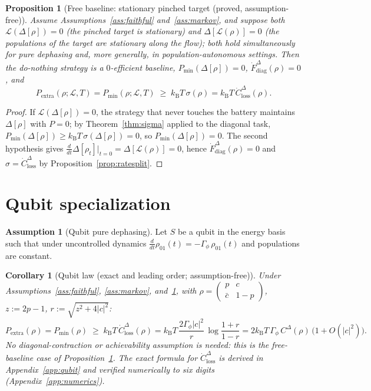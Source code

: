 \documentclass[11pt,a4paper]{article}
\theoremstyle{plain}
\newtheorem{proposition}[theorem]{Proposition}
\newtheorem{corollary}[theorem]{Corollary}
\theoremstyle{definition}
\newtheorem{assumption}[theorem]{Assumption}
\theoremstyle{remark}
\newcommand{\kB}{k_{\mathrm{B}}}
\newcommand{\Pmin}{P_{\min}}
\newcommand{\Pextra}{P_{\mathrm{extra}}}
\newcommand{\Closs}{\dot{C}^{\Delta}_{\mathrm{loss}}}
\newcommand{\Fdiag}{\dot{F}^{\Delta}_{\mathrm{diag}}}
\begin{document}
\begin{proposition}[Free baseline: stationary pinched target (proved,
assumption-free)]\label{prop:freebaseline}
Assume Assumptions~\ref{ass:faithful} and~\ref{ass:markov}, and suppose both
$\mathcal{L}(\Delta[\rho]) = 0$ (the pinched target is stationary) \emph{and}
$\Delta[\mathcal{L}(\rho)] = 0$ (the populations of the target are stationary
along the flow); both hold simultaneously for pure dephasing and, more
generally, in population-autonomous settings. Then the do-nothing strategy is a $0$-efficient baseline,
$\Pmin(\Delta[\rho]) = 0$, $\Fdiag(\rho) = 0$, and
\begin{equation}
\Pextra(\rho; \mathcal{L}, T) = \Pmin(\rho; \mathcal{L}, T)
\;\ge\; \kB T\,\sigma(\rho) = \kB T\, \Closs(\rho).
\end{equation}
\end{proposition}

\begin{proof}
If $\mathcal{L}(\Delta[\rho]) = 0$, the strategy that never touches the battery
maintains $\Delta[\rho]$ with $P = 0$; by Theorem~\ref{thm:sigma} applied to
the diagonal task, $\Pmin(\Delta[\rho]) \ge \kB T\,\sigma(\Delta[\rho]) = 0$,
so $\Pmin(\Delta[\rho]) = 0$. The second hypothesis gives
$\frac{d}{dt}\Delta[\rho_t]\big|_{t=0} = \Delta[\mathcal{L}(\rho)] = 0$,
hence $\Fdiag(\rho) = 0$ and
$\sigma = \Closs$ by Proposition~\ref{prop:ratesplit}.
\end{proof}

\section{Qubit specialization}\label{sec:qubit}

\begin{assumption}[Qubit pure dephasing]\label{ass:dephasing}
Let $S$ be a qubit in the energy basis such that under uncontrolled dynamics
$\frac{d}{dt}\rho_{01}(t) = -\Gamma_\phi\, \rho_{01}(t)$ and populations are
constant.
\end{assumption}

\begin{corollary}[Qubit law (exact and leading order; assumption-free)]
\label{cor:qubit}
Under Assumptions~\ref{ass:faithful}, \ref{ass:markov},
and~\ref{ass:dephasing}, with $\rho = \begin{pmatrix} p & c \\ \bar{c} & 1-p
\end{pmatrix}$, $z := 2p - 1$, $r := \sqrt{z^2 + 4|c|^2}$:
\begin{equation}
\Pextra(\rho) = \Pmin(\rho) \;\ge\; \kB T\, \Closs(\rho)
= \kB T\, \frac{2\Gamma_\phi |c|^2}{r}\,\log\frac{1+r}{1-r}
= 2\kB T\, \Gamma_\phi\, C^\Delta(\rho)\,\big(1 + O(|c|^2)\big).
\end{equation}
No diagonal-contraction or achievability assumption is needed: this is the
free-baseline case of Proposition~\ref{prop:freebaseline}. The exact formula
for $\Closs$ is derived in Appendix~\ref{app:qubit} and verified numerically to
six digits (Appendix~\ref{app:numerics}).
\end{corollary}
\end{document}
